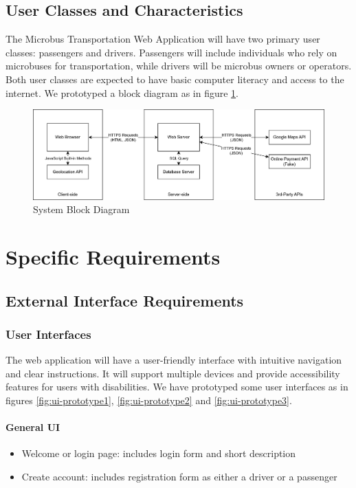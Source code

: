 \documentclass{BusMateSRS}
\begin{document}
\section{User Classes and Characteristics}
The Microbus Transportation Web Application will have two primary user classes:
passengers and drivers. Passengers will include individuals who rely on
microbuses for transportation, while drivers will be microbus owners or
operators.
Both user classes are expected to have basic computer literacy and
access to the internet.
We prototyped a block diagram as in figure \ref{fig:system-block-diagram}.

\begin{figure}[h!]
	\centering
	\includegraphics[width=\columnwidth]{drawings/system-block-diagram.drawio.png}
	\caption{System Block Diagram}
	\label{fig:system-block-diagram}
\end{figure}

\chapter{Specific Requirements}
\section{External Interface Requirements}
\subsection{User Interfaces}
The web application will have a user-friendly interface with intuitive
navigation and clear instructions. It will support multiple devices and
provide accessibility features for users with disabilities.
We have prototyped some user interfaces as in figures
\ref{fig:ui-prototype1}, \ref{fig:ui-prototype2} and \ref{fig:ui-prototype3}.

\subsubsection{General UI}
\begin{itemize}
	\item Welcome or login page:
	      includes login form and short description
	\item Create account:
	      includes registration form as either a driver or a passenger
\end{itemize}
\end{document}
